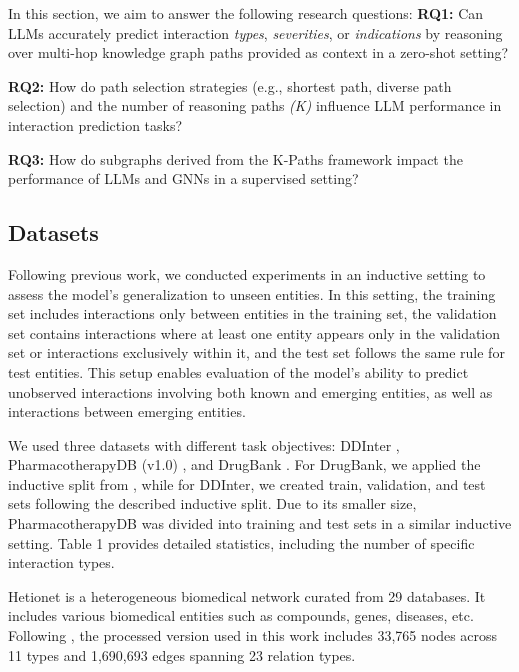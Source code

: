 In this section, we aim to answer the following research questions:
\textbf{RQ1:} Can LLMs accurately predict interaction \textit{types}, \textit{severities}, or \textit{indications} by reasoning over multi-hop knowledge graph paths provided as context in a zero-shot setting? 

\noindent
\textbf{RQ2:} How do path selection strategies (e.g., shortest path, diverse path selection) and the number of reasoning paths \textit{(K)} influence LLM performance in interaction prediction tasks? 

\noindent
\textbf{RQ3:} How do subgraphs derived from the K-Paths framework impact the performance of LLMs and GNNs in a supervised setting?

\subsection{Datasets} \label{sec:datasets}  
 Following previous work, we conducted experiments in an inductive setting to assess the model's generalization to unseen entities.
In this setting, the training set includes interactions only between entities in the training set, the validation set contains interactions where at least one entity appears only in the validation set or interactions exclusively within it, and the test set follows the same rule for test entities.
This setup enables evaluation of the model's ability to predict unobserved interactions involving both known and emerging entities, as well as interactions between emerging entities.

We used three datasets with different task objectives: DDInter \cite{xiong2022ddinter}, PharmacotherapyDB (v1.0) \cite{himmelstein2016pharmacotherapydb}, and DrugBank \cite{wishart2018drugbank}.
For DrugBank, we applied the inductive split from \cite{du2024customized}, while for DDInter, we created train, validation, and test sets following the described inductive split. Due to its smaller size, PharmacotherapyDB was divided into training and test sets in a similar inductive setting. 
Table 1 provides detailed statistics, including the number of specific interaction types.

 Hetionet is a heterogeneous biomedical network curated from 29 databases. It includes various biomedical entities such as compounds, genes, diseases, etc. Following \cite{yu2021sumgnn}, the processed version used in this work includes 33,765 nodes across 11 types and 1,690,693 edges spanning 23 relation types.


